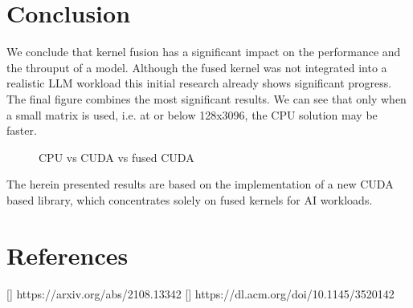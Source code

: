 \documentclass[letterpaper]{article}
\begin{document}
\section{Conclusion}



We conclude that kernel fusion has a significant impact on the performance and the throuput of a model. Although the fused kernel was not integrated into a realistic LLM workload this initial research already shows significant progress. The final figure combines the most significant results. We can see that only when a small matrix is used, i.e. at or below 128x3096, the CPU solution may be faster. 

\begin{figure}
\caption{CPU vs CUDA vs fused CUDA}
\label{cudaGelu}
\end{figure}


The herein presented results are based on the implementation of a new CUDA based library, which concentrates solely on fused kernels for AI workloads. 

\section{References}
[] https://arxiv.org/abs/2108.13342
[] https://dl.acm.org/doi/10.1145/3520142
\end{document}

